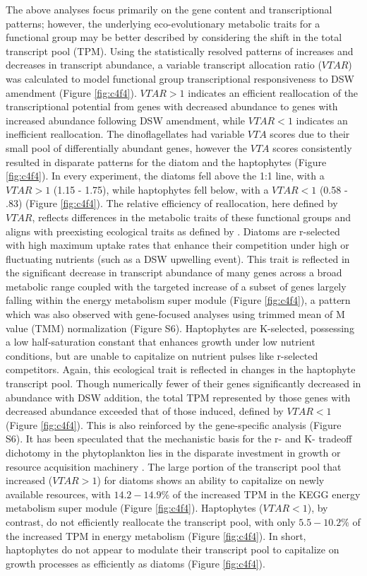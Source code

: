 The above analyses focus primarily on the gene content and transcriptional patterns; however, the underlying eco-evolutionary metabolic traits for a functional group may be better described by considering the shift in the total transcript pool (TPM). Using the statistically resolved patterns of increases and decreases in transcript abundance, a variable transcript allocation ratio ($VTAR$) was calculated to model functional group transcriptional responsiveness to DSW amendment (Figure \ref{fig:c4f4}). $VTAR > 1$ indicates an efficient reallocation of the transcriptional potential from genes with decreased abundance to genes with increased abundance following DSW amendment, while $VTAR < 1$ indicates an inefficient reallocation. The dinoflagellates had variable $VTA$ scores due to their small pool of differentially abundant genes, however the $VTA$ scores consistently resulted in disparate patterns for the diatom and the haptophytes (Figure \ref{fig:c4f4}). In every experiment, the diatoms fell above the 1:1 line, with a $VTAR > 1$ (1.15 - 1.75), while haptophytes fell below, with a $VTAR < 1$ (0.58 - .83) (Figure \ref{fig:c4f4}). The relative efficiency of reallocation, here defined by $VTAR$, reflects differences in the metabolic traits of these functional groups and aligns with preexisting ecological traits as defined by \citep{Margalef1978}. Diatoms are r-selected with high maximum uptake rates that enhance their competition under high or fluctuating nutrients (such as a DSW upwelling event). This trait is reflected in the significant decrease in transcript abundance of many genes across a broad metabolic range coupled with the targeted increase of a subset of genes largely falling within the energy metabolism super module (Figure \ref{fig:c4f4}), a pattern which was also observed with gene-focused analyses using trimmed mean of M value (TMM) normalization \citep{Marchetti2012a, Robinson2010} (Figure S6). Haptophytes are K-selected, possessing a low half-saturation constant that enhances growth under low nutrient conditions, but are unable to capitalize on nutrient pulses like r-selected competitors. Again, this ecological trait is reflected in changes in the haptophyte transcript pool. Though numerically fewer of their genes significantly decreased in abundance with DSW addition, the total TPM represented by those genes with decreased abundance exceeded that of those induced, defined by $VTAR < 1 $ (Figure \ref{fig:c4f4}). This is also reinforced by the gene-specific analysis (Figure S6). It has been speculated that the mechanistic basis for the r- and K- tradeoff dichotomy in the phytoplankton lies in the disparate investment in growth or resource acquisition machinery \citep{Litchman2008}. The large portion of the transcript pool that increased ($VTAR > 1$) for diatoms shows an ability to capitalize on newly available resources, with $14.2-14.9 \% $ of the increased TPM in the KEGG energy metabolism super module (Figure \ref{fig:c4f4}). Haptophytes ($VTAR < 1$), by contrast, do not efficiently reallocate the transcript pool, with only $5.5-10.2 \% $ of the increased TPM in energy metabolism (Figure \ref{fig:c4f4}). In short, haptophytes do not appear to modulate their transcript pool to capitalize on growth processes as efficiently as diatoms (Figure \ref{fig:c4f4}). \par
